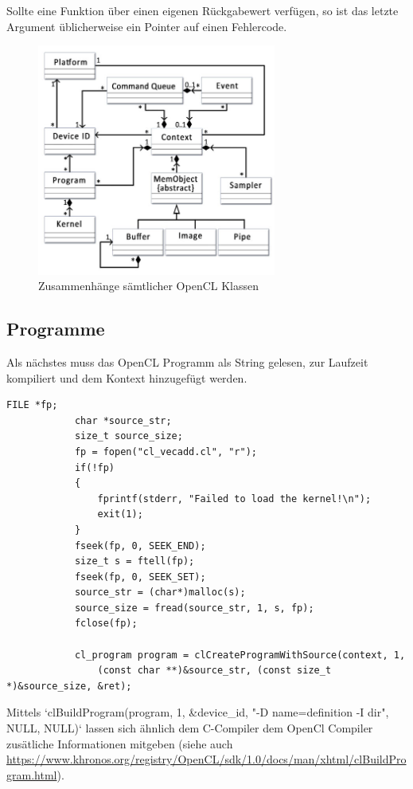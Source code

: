 			Sollte eine Funktion über einen eigenen Rückgabewert verfügen, so ist das letzte Argument üblicherweise ein Pointer auf einen Fehlercode.
			\begin{figure}[h]
				\centering
				\includegraphics[width=0.7\textwidth]{chapter4/pictures/class.png}
				\caption{Zusammenhänge sämtlicher OpenCL Klassen}
				\label{4:class}
			\end{figure}				
				
			\subsection{Programme}
			Als nächstes muss das OpenCL Programm als String gelesen, zur Laufzeit kompiliert und dem Kontext hinzugefügt werden. 
			\begin{lstlisting}[caption=OpenCL Programm]
			FILE *fp;
			char *source_str;
			size_t source_size;
			fp = fopen("cl_vecadd.cl", "r");
			if(!fp)
			{
				fprintf(stderr, "Failed to load the kernel!\n");
				exit(1);
			}
			fseek(fp, 0, SEEK_END);
			size_t s = ftell(fp);
			fseek(fp, 0, SEEK_SET); 
			source_str = (char*)malloc(s);
			source_size = fread(source_str, 1, s, fp);
			fclose(fp);
			
			cl_program program = clCreateProgramWithSource(context, 1, 
				(const char **)&source_str, (const size_t *)&source_size, &ret);
			\end{lstlisting}
			
			Mittels \li`clBuildProgram(program, 1, &device_id, "-D name=definition -I dir", NULL, NULL)` lassen sich ähnlich dem C-Compiler dem OpenCl Compiler zusätliche Informationen mitgeben (siehe auch \url{https://www.khronos.org/registry/OpenCL/sdk/1.0/docs/man/xhtml/clBuildProgram.html}). 
			
